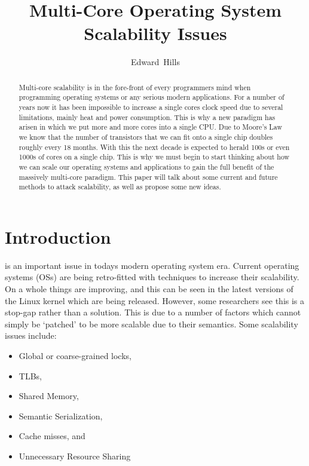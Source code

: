 \documentclass[journal]{IEEEtran}
\begin{document}
\title{Multi-Core Operating System Scalability Issues}

\author{Edward~Hills}

\maketitle

\begin{abstract}

Multi-core scalability is in the fore-front of every programmers mind when programming operating systems or any serious modern applications. For a number of years now it has been impossible to increase a single cores clock speed due to several limitations, mainly heat and power consumption. This is why a new paradigm has arisen in which we put more and more cores into a single CPU. Due to Moore's Law we know that the number of transistors that we can fit onto a single chip doubles roughly every 18 months. With this the next decade is expected to herald 100s or even 1000s of cores on a single chip. This is why we must begin to start thinking about how we can scale our operating systems and applications to gain the full benefit of the massively multi-core paradigm. This paper will talk about some current and future methods to attack scalability, as well as propose some new ideas.

\end{abstract}

\section{Introduction}
 is an important issue in todays modern operating system era. Current operating systems (OSs) are being retro-fitted with techniques to increase their scalability. On a whole things are improving, and this can be seen in the latest versions of the Linux kernel which are being released. However, some researchers see this is a stop-gap rather than a solution. This is due to a number of factors which cannot simply be `patched' to be more scalable due to their semantics. Some scalability issues include:

\vspace{2mm}

\begin{itemize}
\item Global or coarse-grained locks,
\item TLBs,
\item Shared Memory,
\item Semantic Serialization,
\item Cache misses, and
\item Unnecessary Resource Sharing
\end{itemize}
\end{document}
